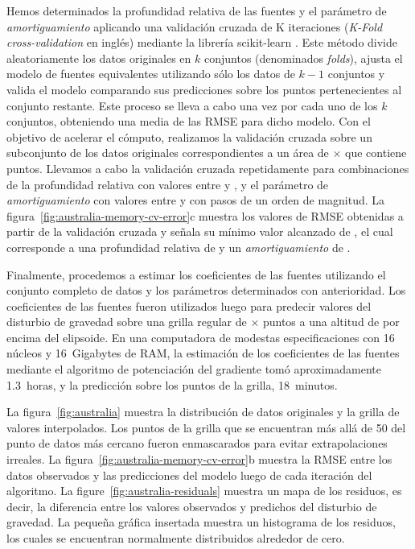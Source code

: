 Hemos determinados la profundidad relativa de las fuentes y el parámetro de
\emph{amortiguamiento} aplicando una validación cruzada de K iteraciones
(\emph{K-Fold cross-validation} en inglés) mediante la librería scikit-learn
\citep{sklearn2011}.
Este método divide aleatoriamente los datos originales en $k$ conjuntos
(denominados \emph{folds}), ajusta el modelo de fuentes equivalentes utilizando
sólo los datos de $k - 1$ conjuntos y valida el modelo comparando sus
predicciones sobre los puntos pertenecientes al conjunto restante.
Este proceso se lleva a cabo una vez por cada uno de los $k$ conjuntos,
obteniendo una media de las \ac{RMSE} para dicho modelo.
Con el objetivo de acelerar el cómputo, realizamos la validación cruzada sobre
un subconjunto de los datos originales correspondientes a un área de
\AustraliaSmallAreaEastingSize{}$\times$\AustraliaSmallAreaNorthingSize{}
que contiene \AustraliaSmallAreaNPoints{} puntos.
Llevamos a cabo la validación cruzada repetidamente para combinaciones de la
profundidad relativa con valores entre \AustraliaDepthMin{}
y \AustraliaDepthMax{}, y el parámetro de \emph{amortiguamiento} con valores
entre \AustraliaDampingMin{} y \AustraliaDampingMax{} con pasos de un orden de
magnitud.
La figura~\ref{fig:australia-memory-cv-error}c muestra los valores de \ac{RMSE}
obtenidas a partir de la validación cruzada y señala su mínimo valor alcanzado
de \AustraliaEqlRmsScore{}, el cual corresponde a una profundidad relativa de
\AustraliaEqlDepth{} y un \emph{amortiguamiento} de \AustraliaEqlDamping{}.

Finalmente, procedemos a estimar los coeficientes de las fuentes utilizando el
conjunto completo de datos y los parámetros determinados con anterioridad.
Los coeficientes de las fuentes fueron utilizados luego para predecir valores
del disturbio de gravedad sobre una grilla regular de
\AustraliaEqlGridNLongitude{}$\times$\AustraliaEqlGridNLatitude{} puntos a una
altitud de
\AustraliaEqlGridHeight{} por encima del elipsoide.
En una computadora de modestas especificaciones con 16 núcleos y 16~Gigabytes
de RAM, la estimación de los coeficientes de las \AustraliaEqlNSources{}
fuentes mediante el algoritmo de potenciación del gradiente tomó
aproximadamente 1.3~horas, y la predicción sobre los puntos de la grilla,
18~minutos.

La figura~\ref{fig:australia}
muestra la distribución de datos originales y la grilla de valores
interpolados.
Los puntos de la grilla que se encuentran más allá de 50\km{} del punto de
datos más cercano fueron enmascarados para evitar extrapolaciones irreales.
La figura~\ref{fig:australia-memory-cv-error}b muestra la \ac{RMSE} entre los
datos observados y las predicciones del modelo luego de cada iteración del
algoritmo.
La figure~\ref{fig:australia-residuals}
muestra un mapa de los residuos, es decir, la diferencia entre los valores
observados y predichos del disturbio de gravedad.
La pequeña gráfica insertada muestra un histograma de los residuos, los cuales
se encuentran normalmente distribuidos alrededor de cero.

